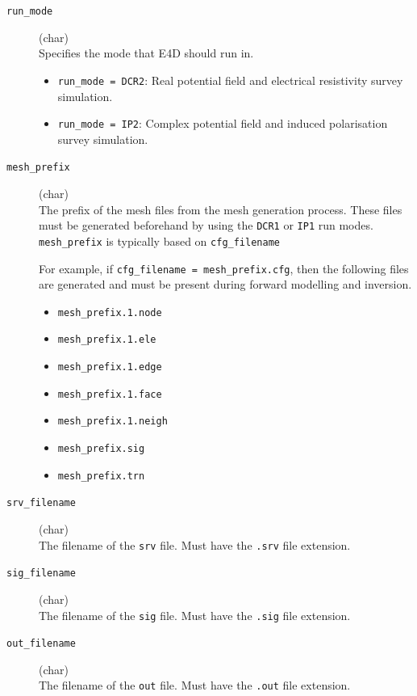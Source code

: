 \documentclass[a4paper,12pt]{article}
\begin{document}
\begin{description}
    \item[\texttt{run\_mode}] (char)\hfill \\
    Specifies the mode that E4D should run in.
    \begin{itemize}
        \item \texttt{run\_mode = DCR2}: Real potential field and electrical resistivity survey simulation.
        \item \texttt{run\_mode = IP2}: Complex potential field and induced polarisation survey simulation.
    \end{itemize}
    
    \item[\texttt{mesh\_prefix}] (char)\hfill \\
    The prefix of the mesh files from the mesh generation process. These files must be generated beforehand by using the \texttt{DCR1} or \texttt{IP1} run modes. \texttt{mesh\_prefix} is typically based on \texttt{cfg\_filename}

    For example, if \texttt{cfg\_filename = mesh\_prefix.cfg}, then the following files are generated and must be present during forward modelling and inversion.

    \begin{itemize}
        \item \texttt{mesh\_prefix.1.node}
        \item \texttt{mesh\_prefix.1.ele}
        \item \texttt{mesh\_prefix.1.edge}
        \item \texttt{mesh\_prefix.1.face}
        \item \texttt{mesh\_prefix.1.neigh}
        \item \texttt{mesh\_prefix.sig}
        \item \texttt{mesh\_prefix.trn}
    \end{itemize}

    \item[\texttt{srv\_filename}] (char)\hfill \\
    The filename of the \texttt{srv} file. Must have the \texttt{.srv} file extension.

    \item[\texttt{sig\_filename}] (char)\hfill \\
    The filename of the \texttt{sig} file. Must have the \texttt{.sig} file extension.

    \item[\texttt{out\_filename}] (char)\hfill \\
    The filename of the \texttt{out} file. Must have the \texttt{.out} file extension.
\end{description}
\end{document}

